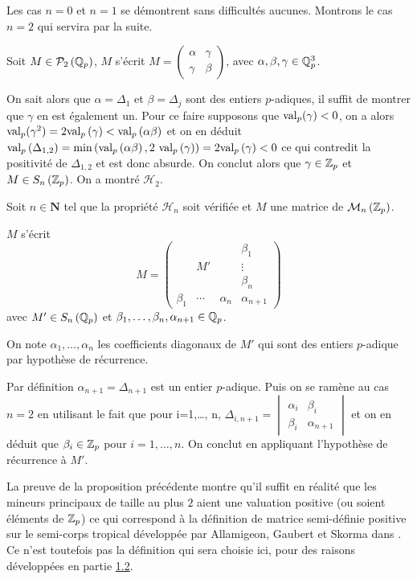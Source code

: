  Les cas $n=0$ et $n=1$ se démontrent sans difficultés aucunes. Montrons le cas $n=2$ qui servira par la suite.

 Soit $M \in \mathcal{P}_2\left( \mathbb{Q}_p \right) $, $M$ s'écrit $M = \begin{pmatrix} \alpha & \gamma \\ \gamma & \beta \end{pmatrix}$, avec $\alpha, \beta, \gamma \in \mathbb{Q}_p^3$.



 On sait alors que $ \alpha = \Delta_1$ et $ \beta = \Delta_j$ sont des entiers $p$-adiques, il suffit de montrer que $\gamma$ en est également un. Pour ce faire supposons que $ \text{val}_p (\gamma) < 0$, on a alors $\text{val}_p ( \gamma^2) = 2 \text{val}_p\left( \gamma \right) < \text{val}_p\left( \alpha \beta \right) $ et on en déduit $ \text{val}_p \left( \Delta_{1,2} \right)= \min\left( \text{val}_p\left( \alpha \beta \right),2~ \text{val}_p \left( \gamma \right) \right) = 2 \text{val}_p\left( \gamma \right) <0 $ ce qui contredit la positivité de $\Delta_{1,2}$ et est donc absurde. On conclut alors que $ \gamma \in  \mathbb {Z}_p $ et $M \in  S_n\left(  \mathbb {Z}_p  \right) $. On a montré $\mathcal{H}_2$. 

 Soit $n \in \mathbf{N}$ tel que la propriété $\mathcal{H}_n $ soit vérifiée et $M$ une matrice de $\mathcal{M}_n \left(  \mathbb {Z}_p  \right)$. 

 $M$ s'écrit 
 \[
 M= \left(\begin{array}{ccc|c}
  &      &     &   \beta_1  \\
  &  M'  &     &\vdots\\
  &      &     &   \beta_n  \\
\hline
\beta_1 &\cdots&  \alpha_n  & \alpha_{n+1}
\end{array} \right)
\]
avec $M' \in S_n\left( \mathbb{Q}_p \right) $ et $\beta_1,\ldots, \beta_n, \alpha_{n+1} \in \mathbb{Q}_p$.

On note $ \alpha_1,\ldots, \alpha_n$ les coefficients diagonaux de $M'$ qui sont des entiers $p$-adique par hypothèse de récurrence. 


 Par définition $ \alpha_{n+1} = \Delta_{n+1}$ est un entier $p$-adique. Puis on se ramène au cas $n=2$ en utilisant le fait que pour i=1,\ldots, n, $\Delta_{i,n+1} = \begin{vmatrix} \alpha_{i} & \beta_{i}\\ \beta_{i} & \alpha_{n+1} \end{vmatrix} $ et on en déduit que $\beta_{i} \in  \mathbb {Z}_p $ pour $i=1,\ldots,n$. On conclut en appliquant l'hypothèse de récurrence à $M'$.


\hfill \qedsymbol
\begin{remarque}
	
	La preuve de la proposition précédente montre qu'il suffit en réalité que les mineurs principaux de taille au plus $2$ aient une valuation positive (ou soient éléments de $ \mathbb {Z}_p $) ce qui correspond à la définition de matrice semi-définie positive sur le semi-corps tropical développée par Allamigeon, Gaubert et Skorma dans \cite{allamigeon_tropical_2020} . Ce n'est toutefois pas la définition qui sera choisie ici, pour des raisons développées en partie \hyperlink{subsection.1.2}{1.2}.
\end{remarque}

